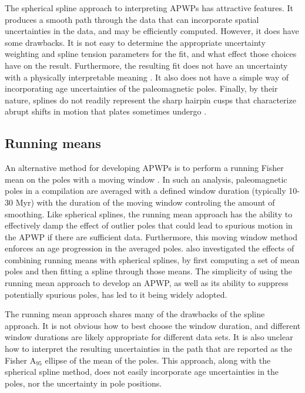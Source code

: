\documentclass[11pt,letterpaper]{article}
\begin{document}
The spherical spline approach to interpreting APWPs has attractive features. It produces a smooth path through the data that can incorporate spatial uncertainties in the data, and may be efficiently computed. However, it does have some drawbacks. It is not easy to determine the appropriate uncertainty weighting and spline tension parameters for the fit, and what effect those choices have on the result. Furthermore, the resulting fit does not have an uncertainty with a physically interpretable meaning \citep{Torsvik1996a}. It also does not have a simple way of incorporating age uncertainties of the paleomagnetic poles. Finally, by their nature, splines do not readily represent the sharp hairpin cusps that characterize abrupt shifts in motion that plates sometimes undergo \citep{Irving1972a, Gordon1984a}.

\subsection*{Running means}

An alternative method for developing APWPs is to perform a running Fisher mean on the poles with a moving window \citep{Irving1977a, Van-der-Voo2001a, Torsvik2008a}. In such an analysis, paleomagnetic poles in a compilation are averaged with a defined window duration (typically 10-30 Myr) with the duration of the moving window controling the amount of smoothing. Like spherical splines, the running mean approach has the ability to effectively damp the effect of outlier poles that could lead to spurious motion in the APWP if there are sufficient data. Furthermore, this moving window method enforces an age progression in the averaged poles. \cite{Torsvik2008a} also investigated the effects of combining running means with spherical splines, by first computing a set of mean poles and then fitting a spline through those means. The simplicity of using the running mean approach to develop an APWP, as well as its ability to suppress potentially spurious poles, has led to it being widely adopted.

The running mean approach shares many of the drawbacks of the spline approach.  It is not obvious how to best choose the window duration, and different window durations are likely appropriate for different data sets.  It is also unclear how to interpret the resulting uncertainties in the path that are reported as the Fisher A$_{95}$ ellipse of the mean of the poles. This approach, along with the spherical spline method, does not easily incorporate age uncertainties in the poles, nor the uncertainty in pole positions.
\end{document}
